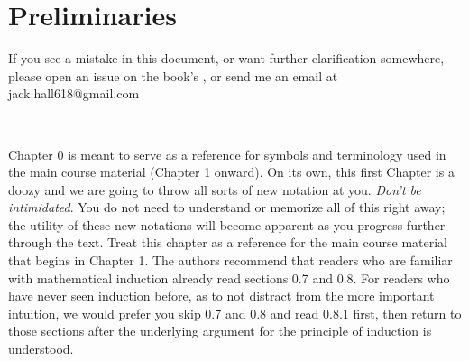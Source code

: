 

\chapter{Preliminaries}
If you see a mistake in this document, or want further clarification somewhere, please open an issue on the book's \href{https://github.com/hilikliming/modern_algebra_with_friends}{}, or send me an email at jack.hall618@gmail.com \steezybreak \\
\noindent 
\begin{tcolorbox}
    \begin{center}
\\
    \end{center}
\end{tcolorbox}


\bigbreak
\noindent Chapter 0 is meant to serve as a reference for symbols and terminology used in the main course material (Chapter 1 onward). On its own, this first Chapter is a doozy and we are going to throw all sorts of new notation at you. \textit{Don't be intimidated}. You do not need to understand or memorize all of this right away; the utility of these new notations will become apparent as you progress further through the text. Treat this chapter as a reference for the main course material that begins in Chapter 1. The authors recommend that readers who are familiar with mathematical induction already read sections 0.7 and 0.8. For readers who have never seen induction before, as to not distract from the more important intuition, we would prefer you skip 0.7 and 0.8 and read 0.8.1 first, then return to those sections after the underlying argument for the principle of induction is understood.

